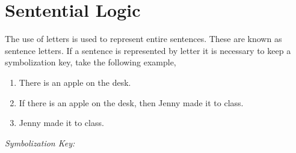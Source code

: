 \documentclass[12pt,a4paper]{article}
\begin{document}
\section*{Sentential Logic}

\par The use of letters is used to represent entire sentences. These are known as sentence letters. If a sentence is represented by letter it is necessary to keep a symbolization key, take the following example,


\begin{enumerate}
	\item There is an apple on the desk.
	\item If there is an apple on the desk, then Jenny made it to class.
	\item Jenny made it to class.
\end{enumerate}

\emph{Symbolization Key:}

\therefore
\end{document}
